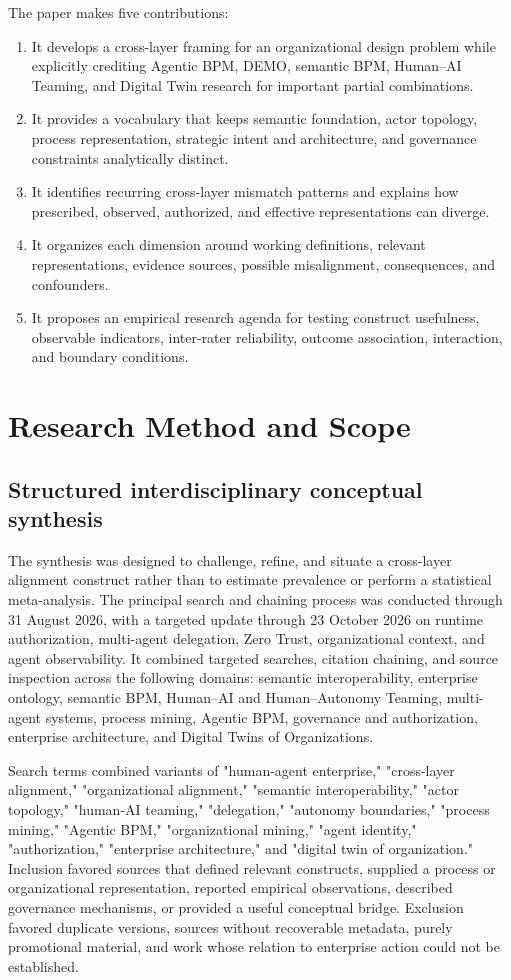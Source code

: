 \documentclass[11pt,letterpaper]{article}
\begin{document}
The paper makes five contributions:

\begin{enumerate}
\item It develops a cross-layer framing for an organizational design problem while explicitly crediting Agentic BPM, DEMO, semantic BPM, Human--AI Teaming, and Digital Twin research for important partial combinations.
\item It provides a vocabulary that keeps semantic foundation, actor topology, process representation, strategic intent and architecture, and governance constraints analytically distinct.
\item It identifies recurring cross-layer mismatch patterns and explains how prescribed, observed, authorized, and effective representations can diverge.
\item It organizes each dimension around working definitions, relevant representations, evidence sources, possible misalignment, consequences, and confounders.
\item It proposes an empirical research agenda for testing construct usefulness, observable indicators, inter-rater reliability, outcome association, interaction, and boundary conditions.
\end{enumerate}

\section{Research Method and Scope}
\subsection{Structured interdisciplinary conceptual synthesis}
The synthesis was designed to challenge, refine, and situate a cross-layer alignment construct rather than to estimate prevalence or perform a statistical meta-analysis. The principal search and chaining process was conducted through 31 August 2026, with a targeted update through 23 October 2026 on runtime authorization, multi-agent delegation, Zero Trust, organizational context, and agent observability. It combined targeted searches, citation chaining, and source inspection across the following domains: semantic interoperability, enterprise ontology, semantic BPM, Human--AI and Human--Autonomy Teaming, multi-agent systems, process mining, Agentic BPM, governance and authorization, enterprise architecture, and Digital Twins of Organizations.

Search terms combined variants of "human-agent enterprise," "cross-layer alignment," "organizational alignment," "semantic interoperability," "actor topology," "human-AI teaming," "delegation," "autonomy boundaries," "process mining," "Agentic BPM," "organizational mining," "agent identity," "authorization," "enterprise architecture," and "digital twin of organization." Inclusion favored sources that defined relevant constructs, supplied a process or organizational representation, reported empirical observations, described governance mechanisms, or provided a useful conceptual bridge. Exclusion favored duplicate versions, sources without recoverable metadata, purely promotional material, and work whose relation to enterprise action could not be established.
\end{document}

